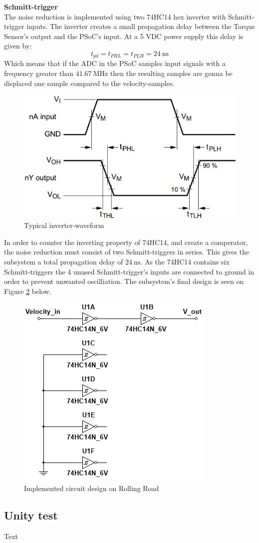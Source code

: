 \textbf{Schmitt-trigger}\\
The noise reduction is implemented using two 74HC14 hex inverter with Schmitt-trigger inputs. The inverter creates a small propagation delay between the Torque Sensor's output and the PSoC's input. At a 5 VDC power supply this delay is given by:
\begin{equation}
	t_{pd} = t_{PHL} = t_{PLH} = \SI{24}{\nano \second}
\end{equation}
Which means that if the ADC in the PSoC samples input signals with a frequency greater than $\SI{41.67}{\mega \hertz}$ then the resulting samples are gonna be displaced one sample compared to the velocity-samples.

\begin{figure}[H]
	\centering
	\includegraphics[width=0.5\linewidth]{Hardware/Pictures/74HC14_waveform}
	\caption{Typical inverter-waveform}
	\label{fig:SchmittTrigger_waveform}
\end{figure}

In order to counter the inverting property of 74HC14, and create a comperator, the noise reduction  must consist of two Schmitt-triggers in series. This gives the subsystem a total propagation delay of $\SI{24}{\nano \second}$. As the 74HC14 contains six Schmitt-triggers the 4 unused Schmitt-trigger's inputs are connected to ground in order to prevent unwanted oscilliation. The subsystem's final design is seen on Figure \ref{fig:SignalConverterVelocity} below.

\begin{figure}[H]
	\centering
	\includegraphics[width=0.5\linewidth]{Hardware/SignalConverter/VelocityDesign}
	\caption{Implemented circuit design on Rolling Road}
	\label{fig:SignalConverterVelocity}
\end{figure}

\subsection{Unity test}
Text